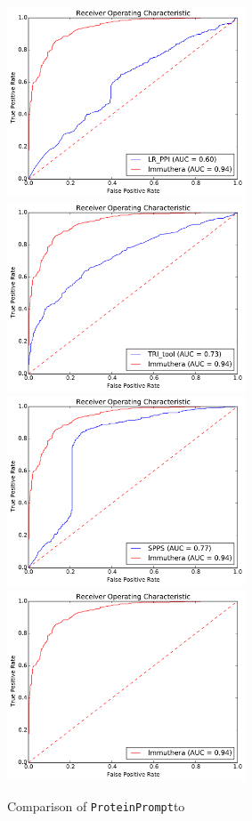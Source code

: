 \documentclass[preprint,3p,times,twocolumn]{elsarticle}
\newcommand{\tool}{\texttt{ProteinPrompt}\hspace{2pt}}
\begin{document}
\begin{figure}
  \includegraphics[width=200pt]{img/LR_PPI_roc.pdf}
  \includegraphics[width=200pt]{img/TRI_tool_roc.pdf} \\

  \includegraphics[width=200pt]{img/SPPS_roc.pdf}
  \includegraphics[width=200pt]{img/meta_roc.pdf}
  \caption{Comparison of \tool to }
  \label{fig:comparison}
\end{figure} 
\end{document}

